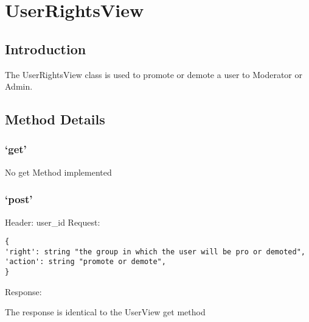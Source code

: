 \chapter*{UserRightsView}

\section*{Introduction}\label{introduction}

The UserRightsView class is used to promote or demote a user to
Moderator or Admin.

\section*{Method Details}\label{method-details}

\subsection*{\texorpdfstring{`get'}{get}}\label{get}

No get Method implemented

\subsection*{\texorpdfstring{`post'}{post}}\label{post}

Header: user\_id Request:

\begin{verbatim}
{
'right': string "the group in which the user will be pro or demoted",
'action': string "promote or demote",
}
\end{verbatim}

Response:

The response is identical to the UserView get method

